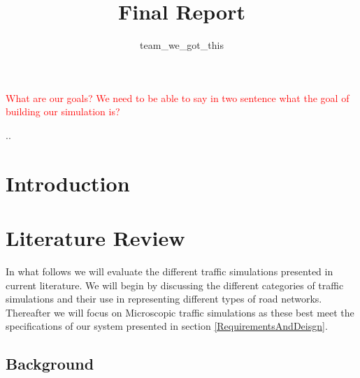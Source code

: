 \documentclass{article}
\begin{document}
\title{Final Report}
\author{team\_we\_got\_this}
\maketitle
\thispagestyle{plain}
\graphicspath{ {Images/} }

\tableofcontents
\listoffigures
\listoftables
\vspace{2cm}
\textcolor{red}{What are our goals? We need to be able to say in two sentence what the goal of building our simulation is? }

\pagebreak
..\section*{Introduction}

\section{Literature Review}
	
	\noindent
	In what follows we will evaluate the different traffic simulations presented in current literature. 
	We will begin by discussing the different categories of traffic simulations and their use in representing different types of road networks. 
	Thereafter we will focus on Microscopic traffic simulations as these best meet the specifications of our system presented in section \ref{RequirementsAndDeisgn}.
	
	\subsection{Background}
	
\end{document}
